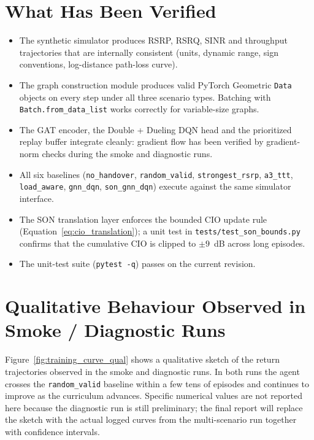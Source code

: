 \documentclass[12pt,a4paper,oneside]{report}
\begin{document}
\section{What Has Been Verified}

\begin{itemize}[leftmargin=*]
    \item The synthetic simulator produces RSRP, RSRQ, SINR and
    throughput trajectories that are internally consistent (units,
    dynamic range, sign conventions, log-distance path-loss curve).
    \item The graph construction module produces valid PyTorch Geometric
    \texttt{Data} objects on every step under all three scenario types.
    Batching with \texttt{Batch.from\_data\_list} works correctly for
    variable-size graphs.
    \item The GAT encoder, the Double + Dueling DQN head and the
    prioritized replay buffer integrate cleanly: gradient flow has been
    verified by gradient-norm checks during the smoke and diagnostic
    runs.
    \item All six baselines (\texttt{no\_handover}, \texttt{random\_valid},
    \texttt{strongest\_rsrp}, \texttt{a3\_ttt}, \texttt{load\_aware},
    \texttt{gnn\_dqn}, \texttt{son\_gnn\_dqn}) execute against the same
    simulator interface.
    \item The SON translation layer enforces the bounded CIO update
    rule (Equation~\eqref{eq:cio_translation}); a unit test in
    \texttt{tests/test\_son\_bounds.py} confirms that the cumulative
    CIO is clipped to $\pm 9$~dB across long episodes.
    \item The unit-test suite (\texttt{pytest -q}) passes on the current
    revision.
\end{itemize}

\section{Qualitative Behaviour Observed in Smoke / Diagnostic Runs}

Figure~\ref{fig:training_curve_qual} shows a qualitative sketch of the
return trajectories observed in the smoke and diagnostic runs. In both
runs the agent crosses the \texttt{random\_valid} baseline within a few
tens of episodes and continues to improve as the curriculum advances.
Specific numerical values are not reported here because the diagnostic
run is still preliminary; the final report will replace the sketch
with the actual logged curves from the multi-scenario run together
with confidence intervals.
\end{document}
